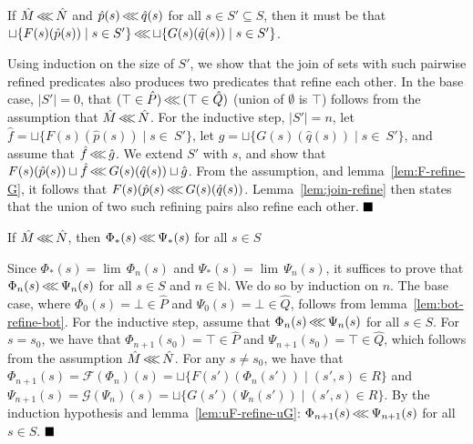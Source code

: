 \begin{lemma} \label{lem:uF-refine-uG}
If $\hat M \operatorname{\lll} \hat N$ and $\hat p(s) \operatorname{\lll} \hat q(s)$ for all $s \in S' \subseteq S$, then it must be that $\sqcup \{ F(s)(\hat p(s)) \mid s \in S' \} \operatorname{\lll} \sqcup \{ G(s)(\hat q(s)) \mid s \in S' \}$.
\end{lemma}

Using induction on the size of $S'$, we show that the join of sets with such pairwise refined predicates also produces two predicates that refine each other. In the base case, $| S' | = 0$, that $(\top \in \hat P) \operatorname{\lll} \, (\top \in \hat Q)$ (union of $\emptyset$ is $\top$) follows from the assumption that $\hat M \operatorname{\lll} \hat N$. For the inductive step, $| S' | = n$, let $\hat f = \sqcup \{ F(s)(\hat p(s)) \mid s \in \: S' \}$, let $\hat g = \sqcup \{ G(s)(\hat q(s)) \mid s \in \: S' \}$, and assume that $\hat f \operatorname{\lll} \hat g$. We extend $S'$ with $s$, and show that $F(s)(\hat p(s)) \sqcup \hat f \operatorname{\lll} G(s)(\hat q(s)) \sqcup \hat g$. From the assumption, and lemma~\ref{lem:F-refine-G}, it follows that $F(s)(\hat p(s) \operatorname{\lll} G(s)(\hat q(s))$. Lemma~\ref{lem:join-refine} then states that the union of two such refining pairs also refine each other. $\qedb$


\begin{lemma} \label{lem:Phi-refine-Psi}
If $\hat M \operatorname{\lll} \hat N$, then $\Phi_{*}(s) \operatorname{\lll} \Psi_{*}(s)$ for all $s \in S$
\end{lemma}

Since $\Phi_{*}(s) = \lim \, \Phi_{n}(s)$ and $\Psi_{*}(s) = \lim \, \Psi_{n}(s)$, it suffices to prove that $\Phi_{n}(s) \operatorname{\lll} \Psi_{n}(s)$ for all $s \in S$ and $n \in \mathbb{N}$. We do so by induction on $n$. The base case, where $\Phi_{0}(s) = \bot \in \hat P$ and $\Psi_{0}(s) = \bot \in \hat Q$, follows from lemma~\ref{lem:bot-refine-bot}. For the inductive step, assume that $\Phi_{n}(s) \operatorname{\lll} \Psi_{n}(s)$ for all $s \in S$. For $s = s_{0}$, we have that $\Phi_{n+1}(s_{0}) = \top \in \hat P$ and $\Psi_{n+1}(s_{0}) = \top \in \hat Q$, which follows from the assumption $\hat M \operatorname{\lll} \hat N$. For any $s \neq s_{0}$, we have that $\Phi_{n+1}(s) = \mathcal{F}(\Phi_{n})(s) = \sqcup \{ F(s')(\Phi_{n}(s')) \mid (s',s) \in R \}$ and $\Psi_{n+1}(s) = \mathcal{G}(\Psi_{n})(s) = \sqcup \{ G(s')(\Psi_{n}(s')) \mid (s',s) \in R \}$. By the induction hypothesis and lemma~\ref{lem:uF-refine-uG}: $\Phi_{n+1}(s) \operatorname{\lll} \Psi_{n+1}(s)$ for all $s \in S$. $\qedb$

